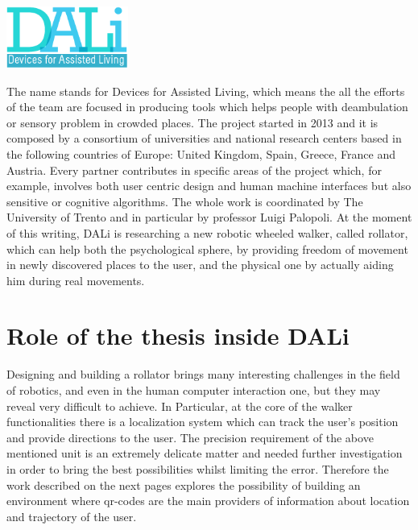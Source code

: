 \vspace{1cm}
\begin{center}
      \includegraphics[width=0.3\textwidth]{img/Dali-logo.png}
\end{center}
\vspace{1cm}

The name stands for Devices for Assisted Living, which means the all the efforts of the team are focused in producing tools which helps people with deambulation or sensory problem in crowded places.
The project started in 2013 and it is composed by a consortium of universities and national research centers based in the following countries of Europe: United Kingdom, Spain, Greece, France and Austria.
Every partner contributes in specific areas of the project which, for example, involves both user centric design and human machine interfaces but also sensitive or cognitive algorithms.
The whole work is coordinated by The University of Trento and in particular by professor Luigi Palopoli.
At the moment of this writing, DALi is researching a new robotic wheeled walker, called rollator, which can help both the psychological sphere, by providing freedom of movement in newly discovered places to the user, and the physical one by actually aiding him during real movements.


\section{Role of the thesis inside DALi}
Designing and building a rollator brings many interesting challenges in the field of robotics, and even in the human computer interaction one, but they may reveal very difficult to achieve. 
In Particular, at the core of the walker functionalities there is a localization system which can track the user's position and provide directions to the user.
The precision requirement of the above mentioned unit is an extremely delicate matter and needed further investigation in order to bring the best possibilities whilst limiting the error.
Therefore the work described on the next pages explores the possibility of building an environment where qr-codes are the main providers of information about location and trajectory of the user.



